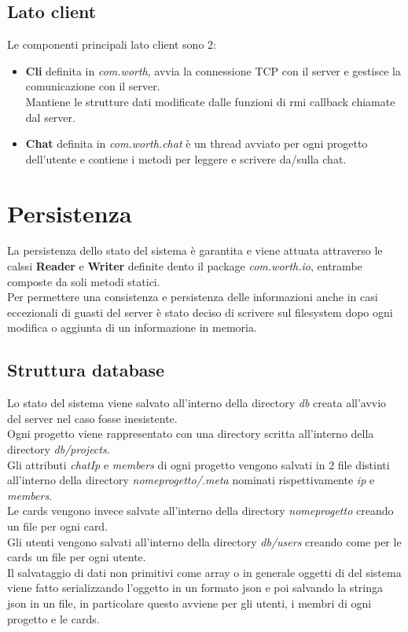 \documentclass[11pt]{report}
\begin{document}
	\subsection{Lato client}
	Le componenti principali lato client sono 2:
	
	\begin{itemize}
		\item \textbf{Cli} definita in \textit{com.worth}, avvia la connessione TCP con il server e gestisce la comunicazione con il server.\\
		Mantiene le strutture dati modificate dalle funzioni di rmi callback chiamate dal server.
		
		\item \textbf{Chat} definita in \textit{com.worth.chat} è un thread avviato per ogni progetto dell'utente e contiene i metodi per leggere e scrivere da/sulla chat.
	\end{itemize}
		 
	
	\section{Persistenza}
	La persistenza dello stato del sistema è garantita e viene attuata attraverso le calssi \textbf{Reader} e \textbf{Writer} definite dento il package \textit{com.worth.io}, entrambe composte da soli metodi statici. \\
	Per permettere una consistenza e persistenza delle informazioni anche in casi eccezionali di guasti del server è stato deciso di scrivere sul filesystem dopo ogni modifica o aggiunta di un informazione in memoria.
	
	\subsection{Struttura database}
	Lo stato del sistema viene salvato all'interno della directory \textit{db} creata all'avvio del server nel caso fosse inesistente.\\
	Ogni progetto viene rappresentato con una directory scritta all'interno della directory \textit{db/projects}. \\
	Gli attributi \textit{chatIp} e \textit{members} di ogni progetto vengono salvati in 2 file distinti all'interno della directory \textit{nomeprogetto/.meta} nominati rispettivamente \textit{ip} e \textit{members}. \\
	Le cards vengono invece salvate all'interno della directory \textit{nomeprogetto} creando un file per ogni card. \\
	Gli utenti vengono salvati all'interno della directory \textit{db/users} creando come per le cards un file per ogni utente. \\
	Il salvataggio di dati non primitivi come array o in generale oggetti di del sistema viene fatto serializzando l'oggetto in un formato json e poi salvando la stringa json in un file, in particolare questo avviene per gli utenti, i membri di ogni progetto e le cards.
	
\end{document}
